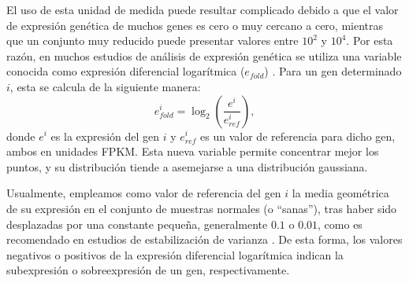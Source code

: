 El uso de esta unidad de medida puede resultar complicado debido a que el valor de expresión genética de muchos genes es cero o muy cercano a cero, mientras que un conjunto muy reducido puede presentar valores entre $10^2$ y $10^4$. Por esta razón, en muchos estudios de análisis de expresión genética se utiliza una variable conocida como expresión diferencial logarítmica ($e_{fold}$) \cite{Law2014voom}. Para un gen determinado $i$, esta se calcula de la siguiente manera:
\begin{equation}
	e^i_{fold} = \log_2\left(\frac{e^i}{e^{i}_{ref}}\right),
\end{equation}
donde $e^i$ es la expresión del gen $i$ y $e^i_{ref}$ es un valor de referencia para dicho gen, ambos en unidades FPKM. Esta nueva variable permite concentrar mejor los puntos, y su distribución tiende a asemejarse a una distribución gaussiana. 

Usualmente, empleamos como valor de referencia del gen $i$ la media geométrica de su expresión en el conjunto de muestras normales (o ``sanas''), tras haber sido desplazadas por una constante pequeña, generalmente $0.1$ o $0.01$, como es recomendado en estudios de estabilización de varianza \cite{Love2014DESeq2}. De esta forma, los valores negativos o positivos de la expresión diferencial logarítmica indican la subexpresión o sobreexpresión de un gen, respectivamente.